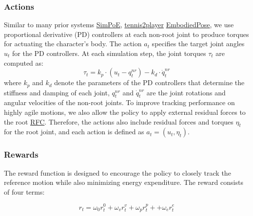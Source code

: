 \documentclass{article}
\begin{document}
\subsubsection{Actions}\label{actions}

Similar to many prior systems \href{https://arxiv.org/abs/2104.00683}{SimPoE}, \href{https://research.nvidia.com/labs/toronto-ai/vid2player3d/data/tennis_skills_main.pdf}{tennis2player} \href{https://github.com/ZhengyiLuo/EmbodiedPose}{EmbodiedPose}, we use proportional derivative (PD) controllers at each non-root joint to produce torques for actuating the character's body. The action $a_t$ specifies the target joint angles $u_t$ for the PD controllers. At each simulation step, the joint torques $\tau_t$ are computed as: \[\tau_t = k_p \cdot (u_t - q_t^{nr}) - k_d \cdot \dot{q}_t^{nr}\] where $k_p$ and $k_d$ denote the parameters of the PD controllers that determine the stiffness and damping of each joint, $q_t^{nr}$ and $\dot{q}_t^{nr}$ are the joint rotations and angular velocities of the non-root joints. To improve tracking performance on highly agile motions, we also allow the policy to apply external residual forces to the root \href{https://github.com/Khrylx/RFC}{RFC}. Therefore, the actions also include residual forces and torques $\eta_t$ for the root joint, and each action is defined as $a_t = (u_t, \eta_t)$.

\subsubsection{Rewards}\label{rewards}

The reward function is designed to encourage the policy to closely track the reference motion while also minimizing energy expenditure. The reward consists of four terms:

\[r_t = \omega_0 r_t^0 + \omega_v r_t^v + \omega_p r_t^p + + \omega_e r_t^e\]



\end{document}
